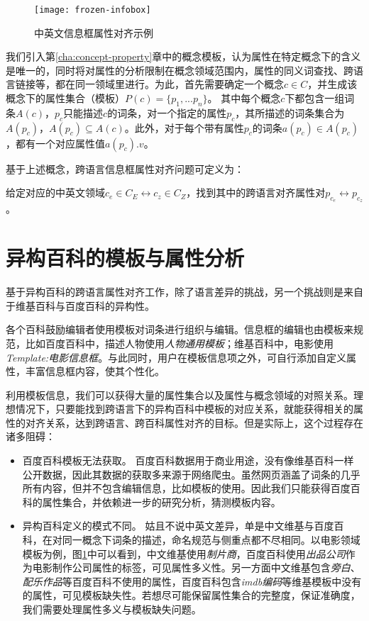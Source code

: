 \begin{figure}[H]
  \centering
  \texttt{[image: frozen-infobox]}
  \caption{中英文信息框属性对齐示例}
  \label{fig:frozen-infobox}
\end{figure}

我们引入第\ref{cha:concept-property}章中的{\heiti 概念模板}，认为属性在特定概念下的含义是唯一的，同时将对属性的分析限制在概念领域范围内，属性的同义词查找、跨语言链接等，都在同一领域里进行。为此，首先需要确定一个概念$c \in C$，并生成该概念下的属性集合（模板）$P(c)=\{p_1,...p_n\}$。
其中每个概念$c$下都包含一组词条$A(c)$，$p_c$只能描述$c$的词条，对一个指定的属性$p_c$，其所描述的词条集合为$A(p_c)$，$A(p_c) \subseteq A(c)$。此外，对于每个带有属性$p_c$的词条$a(p_c) \in A(p_c)$，都有一个对应属性值$a(p_c).v$。

基于上述概念，跨语言信息框属性对齐问题可定义为：
\begin{definition}
给定对应的中英文领域$c_e \in C_E \leftrightarrow c_z \in C_Z$，找到其中的跨语言对齐属性对$p_{c_e} \leftrightarrow p_{c_z}$。
\end{definition}

\section{异构百科的模板与属性分析}
\label{sec:template-property-analysis}

基于异构百科的跨语言属性对齐工作，除了语言差异的挑战，另一个挑战则是来自于维基百科与百度百科的异构性。

各个百科鼓励编辑者使用模板对词条进行组织与编辑。信息框的编辑也由模板来规范，比如百度百科中，描述人物使用\textit{人物通用模板}；维基百科中，电影使用\textit{Template:电影信息框}。与此同时，用户在模板信息项之外，可自行添加自定义属性，丰富信息框内容，使其个性化。

利用模板信息，我们可以获得大量的属性集合以及属性与概念领域的对照关系。理想情况下，只要能找到跨语言下的异构百科中模板的对应关系，就能获得相关的属性的对齐关系，达到跨语言、跨百科属性对齐的目标。但是实际上，这个过程存在诸多阻碍：
\begin{itemize}
\item {\heiti 百度百科模板无法获取。} 百度百科数据用于商业用途，没有像维基百科一样公开数据，因此其数据的获取多来源于网络爬虫。虽然网页涵盖了词条的几乎所有内容，但并不包含编辑信息，比如模板的使用。因此我们只能获得百度百科的属性集合，并依赖进一步的研究分析，猜测模板内容。
\item {\heiti 异构百科定义的模式不同。} 姑且不说中英文差异，单是中文维基与百度百科，在对同一概念下词条的描述，命名规范与侧重点都不尽相同。以电影领域模板为例，图\ref{fig:frozen-infobox}中可以看到，中文维基使用\textit{制片商}，百度百科使用\textit{出品公司}作为电影制作公司属性的标签，可见{\heiti 属性多义性}。另一方面中文维基包含\textit{旁白}、\textit{配乐作品}等百度百科不使用的属性，百度百科包含\textit{imdb编码}等维基模板中没有的属性，可见{\heiti 模板缺失性}。若想尽可能保留属性集合的完整度，保证准确度，我们需要处理属性多义与模板缺失问题。
\end{itemize}

